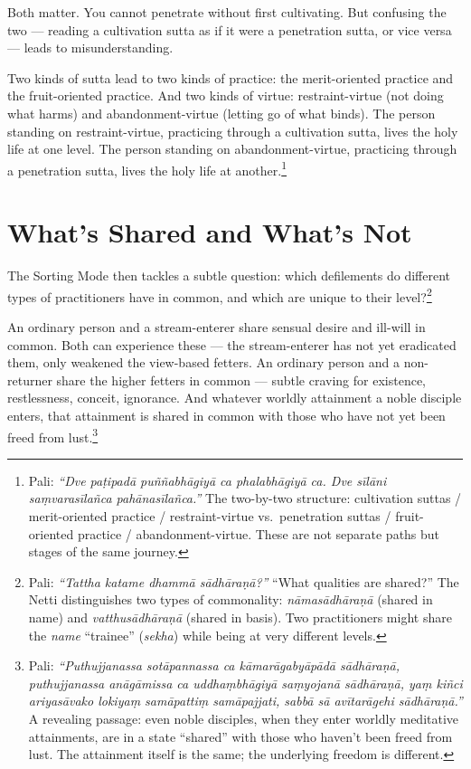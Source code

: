 Both matter. You cannot penetrate without first cultivating. But confusing the two --- reading a cultivation sutta as if it were a penetration sutta, or vice versa --- leads to misunderstanding.

Two kinds of sutta lead to two kinds of practice: the merit-oriented practice and the fruit-oriented practice. And two kinds of virtue: restraint-virtue (not doing what harms) and abandonment-virtue (letting go of what binds). The person standing on restraint-virtue, practicing through a cultivation sutta, lives the holy life at one level. The person standing on abandonment-virtue, practicing through a penetration sutta, lives the holy life at another.\footnote{Pali: \textit{``Dve paṭipadā puññabhāgiyā ca phalabhāgiyā ca. Dve sīlāni saṃvarasīlañca pahānasīlañca.''} The two-by-two structure: cultivation suttas / merit-oriented practice / restraint-virtue vs.\ penetration suttas / fruit-oriented practice / abandonment-virtue. These are not separate paths but stages of the same journey.}

\section*{What's Shared and What's Not}

The Sorting Mode then tackles a subtle question: which defilements do different types of practitioners have in common, and which are unique to their level?\footnote{Pali: \textit{``Tattha katame dhammā sādhāraṇā?''} ``What qualities are shared?'' The Netti distinguishes two types of commonality: \textit{nāmasādhāraṇā} (shared in name) and \textit{vatthusādhāraṇā} (shared in basis). Two practitioners might share the \textit{name} ``trainee'' (\textit{sekha}) while being at very different levels.}

An ordinary person and a stream-enterer share sensual desire and ill-will in common. Both can experience these --- the stream-enterer has not yet eradicated them, only weakened the view-based fetters. An ordinary person and a non-returner share the higher fetters in common --- subtle craving for existence, restlessness, conceit, ignorance. And whatever worldly attainment a noble disciple enters, that attainment is shared in common with those who have not yet been freed from lust.\footnote{Pali: \textit{``Puthujjanassa sotāpannassa ca kāmarāgabyāpādā sādhāraṇā, puthujjanassa anāgāmissa ca uddhaṃbhāgiyā saṃyojanā sādhāraṇā, yaṃ kiñci ariyasāvako lokiyaṃ samāpattiṃ samāpajjati, sabbā sā avītarāgehi sādhāraṇā.''} A revealing passage: even noble disciples, when they enter worldly meditative attainments, are in a state ``shared'' with those who haven't been freed from lust. The attainment itself is the same; the underlying freedom is different.}


